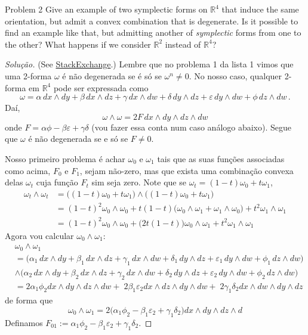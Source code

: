 \begin{idea8}{Problem 2}\leavevmode
	Give an example of two symplectic forms on $\mathbb{R}^{4}$ that induce the same orientation, but admit a convex combination that is degenerate. Is it possible to find an example like that, but admitting another of \textit{symplectic} forms from one to the other? What happens if we consider $\mathbb{R}^{2}$ instead of $\mathbb{R}^{4}$?
\end{idea8}

\begin{proof}[Solução]\leavevmode
	{\color{2} (See \href{https://math.stackexchange.com/questions/2864834/non-linear-path-between-symplectic-forms-in-mathbbr4}{StackExchange}.)}\hspace{1em} Lembre que no problema 1 da lista 1 vimos que uma 2-forma $\omega$ é não degenerada se é só se $\omega^n\neq 0$. No nosso caso, qualquer 2-forma em $\mathbb{R}^{4}$ pode ser expressada como
	\[\omega = \alpha \, dx \wedge dy + \beta \, dx \wedge dz + \gamma \, dx \wedge dw + \delta \, dy \wedge dz + \varepsilon \, dy \wedge dw + \phi \, dz \wedge dw \, .\]
	Daí,
	\[\omega \wedge \omega =2 F \, dx \wedge dy \wedge dz \wedge dw\]
	onde $F = \alpha \phi - \beta \varepsilon + \gamma \delta$ (vou fazer essa conta num caso análogo abaixo). Segue que $\omega$ é não degenerada se e só se $F\neq 0$.

	Nosso primeiro problema é achar $\omega_0$ e $\omega_1$ tais que as suas funções associadas como acima, $F_0$ e $F_1$, sejam não-zero, mas que exista uma combinação convexa delas $\omega_t$ cuja função $F_t$ sim seja zero. Note que se $\omega_t=(1-t)\omega_0+t\omega_1$,
\begin{align*}
	\omega_t\wedge \omega_t&=\Big( (1-t)\omega_0+t\omega_1 \Big) \wedge \Big( (1-t)\omega_0+t \omega_1 \Big) \\
	&=(1-t)^2\omega_0\wedge \omega_0 +t(1-t)\Big(\omega_0\wedge \omega_1+\omega_1\wedge \omega_0\Big)+t^2\omega_1\wedge \omega_1\\
	&=(1-t)^2\omega_0\wedge \omega_0+\Big(2t(1-t)\Big)\omega_0\wedge \omega_1+t^2\omega_1\wedge \omega_1
\end{align*}
Agora vou calcular $\omega_0\wedge \omega_1$:
\begin{align*}
	&\omega_0\wedge \omega_1\\
	&=\Big( \alpha_1 \, dx \wedge dy + \beta_1 \, dx \wedge dz + \gamma_1 \, dx \wedge dw + \delta_1 \, dy \wedge dz + \varepsilon_1 \, dy \wedge dw + \phi_1 \, dz \wedge dw \Big)\\
	&\wedge \Big( \alpha_2 \, dx \wedge dy + \beta_2 \, dx \wedge dz + \gamma_2 \, dx \wedge dw + \delta_2 \, dy \wedge dz + \varepsilon_2 \, dy \wedge dw + \phi_2 \, dz \wedge dw \Big) \\
	&= 2\alpha_1 \phi_2dx\wedge dy\wedge dz\wedge dw+\;2\beta_1\varepsilon_2 dx\wedge dz\wedge dy\wedge dw+\; 2\gamma_1\delta_2dx\wedge dw \wedge dy\wedge dz
\end{align*}
de forma que
\[\omega_0\wedge \omega_1=2\Big(\alpha_1\phi_2-\beta_1 \varepsilon_2+\gamma_1 \delta_2\Big)dx\wedge dy\wedge dz\wedge d\]
Definamos $F_{01}:=\alpha_1\phi_2-\beta_1 \varepsilon_2+\gamma_1 \delta_2$.


\end{proof}

